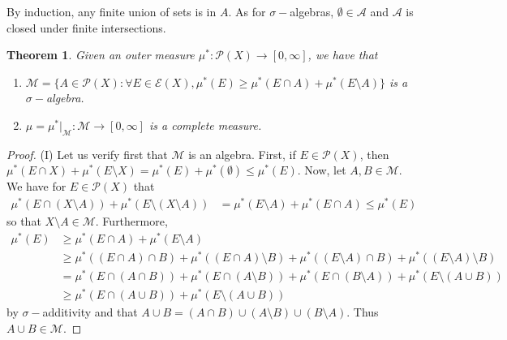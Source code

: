 \documentclass[12pt, a4paper]{memoir}
\newtheorem{theorem}{Theorem}[section]
\theoremstyle{nonumberplain}
\newtheorem{proof}{Proof}
\begin{document}
By induction, any finite union of sets is in $A$.
As for $\sigma-$algebras, $\emptyset\in\mathcal{A}$ and $\mathcal{A}$ is closed under finite intersections.
\begin{theorem}
    Given an outer measure $\mu^*:\mathcal{P}(X)\to[0,\infty]$, we have that
    \begin{enumerate}[nolistsep,label={(\roman*)}]
        \item $\mathcal{M}=\{A\in\mathcal{P}(X):\forall E\in\mathcal{E}(X),\mu^*(E)\geq\mu^*(E\cap A)+\mu^*(E\setminus A)\}$ is a $\sigma-$algebra.
        \item $\mu=\mu^*|_{\mathcal{M}}:\mathcal{M}\to[0,\infty]$ is a complete measure.
    \end{enumerate}
\end{theorem}
\begin{proof}
    (I) Let us verify first that $\mathcal{M}$ is an algebra.
    First, if $E\in\mathcal{P}(X)$, then $\mu^*(E\cap X)+\mu^*(E\setminus X)=\mu^*(E)+\mu^*(\emptyset)\leq \mu^*(E)$.
    Now, let $A,B\in\mathcal{M}$.
    We have for $E\in\mathcal{P}(X)$ that
    \begin{align*}
        \mu^*(E\cap(X\setminus A))+\mu^*(E\setminus(X\setminus A)) &= \mu^*(E\setminus A)+\mu^*(E\cap A)\leq\mu^*(E)
    \end{align*}
    so that $X\setminus A\in\mathcal{M}$.
    Furthermore,
    \begin{align*}
        \mu^*(E) &\geq \mu^*(E\cap A)+\mu^*(E\setminus A)\\
                 &\geq \mu^*((E\cap A)\cap B)+\mu^*((E\cap A)\setminus B)+\mu^*((E\setminus A)\cap B)+\mu^*((E\setminus A)\setminus B)\\
                 &= \mu^*(E\cap(A\cap B))+\mu^*(E\cap(A\setminus B))+\mu^*(E\cap(B\setminus A))+\mu^*(E\setminus(A\cup B))\\
                 &\geq \mu^*(E\cap(A\cup B))+\mu^*(E\setminus(A\cup B))
    \end{align*}
    by $\sigma-$additivity and that $A\cup B=(A\cap B)\cup(A\setminus B)\cup(B\setminus A)$.
    Thus $A\cup B\in\mathcal{M}$.


\end{proof}
\end{document}
